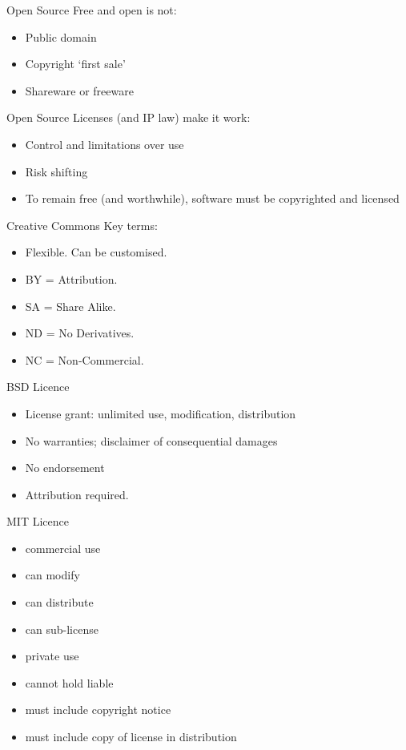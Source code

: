 \begin{frame}{Open Source}
Free and open is not:

	\begin{itemize}
		\item Public domain
		\item Copyright `first sale'
		\item Shareware or freeware
	\end{itemize}
\end{frame}

\begin{frame}{Open Source}
Licenses (and IP law) make it work:

	\begin{itemize}
		\item Control and limitations over use
		\item Risk shifting
		\item To remain free (and worthwhile), software must be copyrighted and licensed
	\end{itemize}
\end{frame}

\begin{frame}{Creative Commons}
Key terms:

	\begin{itemize}
		\item Flexible. Can be customised.
		\item BY = Attribution.
		\item SA = Share Alike.
		\item ND = No Derivatives.
		\item NC = Non-Commercial.
	\end{itemize}
\end{frame}

\begin{frame}{BSD Licence}
	\begin{itemize}
		\item License grant:  unlimited use, modification, distribution
		\item No warranties; disclaimer of consequential damages
		\item No endorsement
		\item Attribution required.
	\end{itemize}
\end{frame}

\begin{frame}{MIT Licence}
	\begin{itemize}
		\item commercial use
		\item can modify
		\item can distribute
		\item can sub-license
		\item private use
		\item cannot hold liable
		\item must include copyright notice
		\item must include copy of license in distribution
	\end{itemize}
\end{frame}


